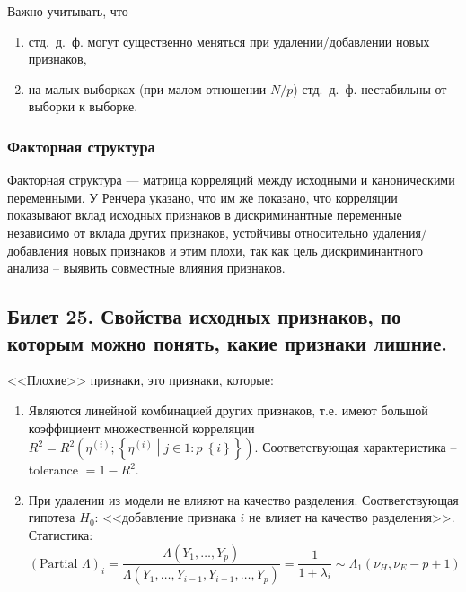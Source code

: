 		Важно учитывать, что
		\begin{enumerate}
			\item стд.~д.~ф. могут существенно меняться при удалении/добавлении новых признаков,
			\item на малых выборках (при малом отношении $N / p$) стд.~д.~ф. нестабильны от выборки к выборке.
		\end{enumerate}

	\subsubsection{Факторная структура}
		Факторная структура --- матрица корреляций между исходными и каноническими переменными. У Ренчера указано, что им же показано, что корреляции показывают вклад исходных признаков в дискриминантные переменные независимо от вклада других признаков, устойчивы относительно удаления/добавления новых признаков и этим плохи, так как цель дискриминантного анализа -- выявить совместные влияния признаков.

\subsection{Билет 25. Свойства исходных признаков, по которым можно понять, какие признаки лишние.}
	<<Плохие>> признаки, это признаки, которые:
	\begin{enumerate}
		\item Являются линейной комбинацией других признаков, т.е. имеют большой коэффициент множественной корреляции $R^2 = R^2\left(\eta^{(i)}; \left\lbrace\eta^{(i)}\middle\vert j\in 1\mathbin : p \ \left\lbrace i \right\rbrace\right\rbrace\right)$. Соответствующая характеристика -- tolerance $= 1 - R^2$.
		\item При удалении из модели не влияют на качество разделения. Соответствующая гипотеза $H_0$: <<добавление признака $i$ не влияет на качество разделения>>. Статистика: 
		\begin{equation}\label{eq:partial lambda}
			\left(\text{Partial } \Lambda\right)_i = \frac{\Lambda\left(Y_1,\ldots, Y_p\right)}{\Lambda\left(Y_1,\ldots,Y_{i-1}, Y_{i+1}, \ldots, Y_p\right)} = \frac{1}{1 + \lambda_i}\sim \Lambda_1\left(\nu_H, \nu_E - p +1\right)
		\end{equation}
	\end{enumerate}

